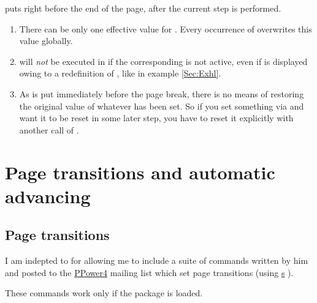    puts  right before the end of the page, after the
  current step is performed.

  \newslide

  \begin{enumerate}
  \item There can be only one effective value for . Every occurrence of  overwrites
    this value globally.
    
  \item {} will \emph{not} be executed in  if the corresponding 
    is not active, even if  is displayed owing to a redefinition of ,
    like in example \ref{Sec:Exhl}.
    
  \item As  is put immediately before the page break, there is no means of restoring the original value
    of whatever has been set. So if you set something via  and want it to be reset in some later
    step, you have to reset it explicitly with another call of .
  \end{enumerate}
  
  \section{Page transitions and automatic advancing}\label{Sec:PageTrans}
  \subsection{Page transitions}
  I am indepted to \href{mailto:dongen@cs.ucc.ie}{} for allowing me to include a suite of commands
  written by him and posted to the \href{http://www-sp.iti.informatik.tu-darmstadt.de/software/ppower4/}{PPower4}
  mailing list which set page transitions (using
  \href{ftp://ftp.dante.de/tex-archive/help/Catalogue/entries/hyperref.html}{s} ).

  These commands work only if the  package is loaded.

    \newslide

